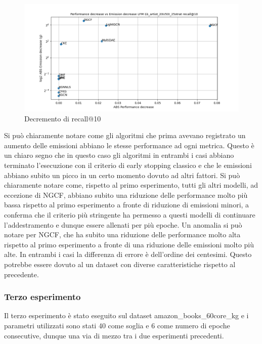 \begin{figure}[H]
    \centering
     \includegraphics[width=\textwidth]{images/decrement_recall@10_LFM-1b_artist_20U50I_25strat.png}
    \caption{Decremento di recall@10}
\end{figure}


\noindent Si può chiaramente notare come gli algoritmi che prima avevano registrato un aumento delle emissioni abbiano le stesse performance ad ogni metrica.
Questo è un chiaro segno che in questo caso gli algoritmi in entrambi i casi abbiano terminato l'esecuzione con il criterio di early stopping classico e che le emissioni abbiano subito un picco in un certo momento dovuto ad altri fattori.
Si può chiaramente notare come, rispetto al primo esperimento, tutti gli altri modelli, ad eccezione di NGCF, abbiano subito una riduzione delle performance molto più bassa rispetto al primo esperimento a fronte di riduzione di emissioni minori, a conferma che il criterio più stringente ha permesso a questi modelli di continuare l'addestramento e dunque essere allenati per più epoche.
Un anomalia si può notare per NGCF, che ha subito una riduzione delle performance molto alta rispetto al primo esperimento a fronte di una riduzione delle emissioni molto più alte. In entrambi i casi la differenza di errore è dell'ordine dei centesimi. Questo potrebbe essere dovuto al un dataset con diverse caratteristiche rispetto al precedente.

\subsubsection{Terzo esperimento}


Il terzo esperimento è stato eseguito sul dataset amazon\_books\_60core\_kg e i parametri utilizzati sono stati 40 come soglia e 6 come numero di epoche consecutive, dunque una via di mezzo tra i due esperimenti precedenti.

